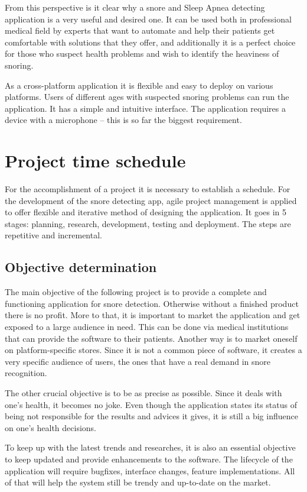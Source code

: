\documentclass[12pt,a4paper]{report}
\begin{document}
From this perspective is it clear why a snore and Sleep Apnea detecting application is a very useful and desired one. It can be used both in professional medical field by experts that want to automate and help their patients get comfortable with solutions that they offer, and additionally it is a perfect choice for those who suspect health problems and wish to identify the heaviness of snoring. 

As a cross-platform application it is flexible and easy to deploy on various platforms. Users of different ages with suspected snoring problems can run the application. It has a simple and intuitive interface. The application requires a device with a microphone -- this is so far the biggest requirement.

\section{Project time schedule}
For the accomplishment of a project it is necessary to establish a schedule. For the development of the snore detecting app, agile project management is applied to offer flexible and iterative method of designing the application. It goes in 5 stages: planning, research, development, testing and deployment. The steps are repetitive and incremental.

\subsection{Objective determination}
The main objective of the following project is to provide a complete and functioning application for snore detection. Otherwise without a finished product there is no profit. More to that, it is important to market the application and get exposed to a large audience in need. This can be done via medical institutions that can provide the software to their patients. Another way is to market oneself on platform-specific stores. Since it is not a common piece of software, it creates a very specific audience of users, the ones that have a real demand in snore recognition. 

The other crucial objective is to be as precise as possible. Since it deals with one's health, it becomes no joke. Even though the application states its status of being not responsible for the results and advices it gives, it is still a big influence on one's health decisions. 

To keep up with the latest trends and researches, it is also an essential objective to keep updated and provide enhancements to the software. The lifecycle of the application will require bugfixes, interface changes, feature implementations. All of that will help the system still be trendy and up-to-date on the market.
\end{document}
